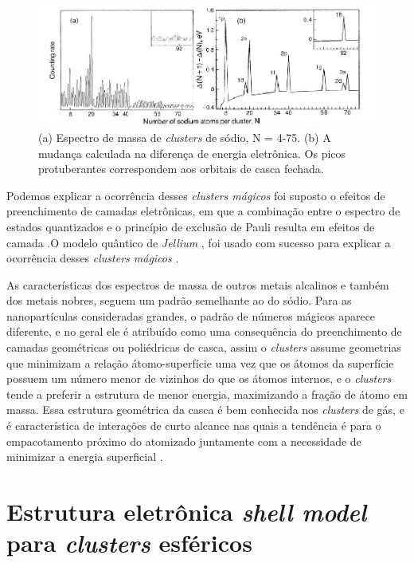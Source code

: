 \begin{figure}
  \centering
  \includegraphics[width=1\textwidth]{images/clusters/NA_knight}
  \caption{(a) Espectro de massa de \textit{clusters} de sódio, N = 4-75.
  (b) A mudança calculada na diferença de energia eletrônica. Os picos protuberantes correspondem aos orbitais de casca fechada.\cite{electronic_Shell_sodium}  }
  \label{fig:espec_na}
\end{figure}


Podemos explicar a ocorrência desses \textit{clusters mágicos} foi suposto o efeitos de preenchimento de camadas eletrônicas, em que a combinação entre o espectro de estados
quantizados e o princípio de exclusão de Pauli resulta em efeitos de camada \cite{Brack}.O modelo quântico de \textit{Jellium} \cite{Heer}, foi usado com sucesso para explicar a ocorrência desses \textit{clusters mágicos} \cite{capitulo_livro_shell}.

As características dos espectros de massa de outros metais alcalinos e também dos metais nobres, seguem um padrão semelhante ao do sódio. Para as nanopartículas consideradas grandes, o padrão de números mágicos aparece diferente, e no geral ele é atribuído como uma consequência do preenchimento de camadas geométricas ou poliédricas de casca, assim o \textit{clusters} assume geometrias que minimizam a relação átomo-superfície uma vez que os átomos da superfície possuem um número menor de vizinhos do que os átomos internos, e o \textit{clusters} tende a preferir a estrutura de menor energia, maximizando a fração de átomo em massa. Essa estrutura geométrica da casca é bem conhecida nos \textit{clusters} de gás, e é característica de interações de curto alcance nas quais a tendência é para o empacotamento próximo do atomizado juntamente com a necessidade de minimizar a energia superficial \cite{capitulo_livro_shell}.




\section{Estrutura eletrônica \textit{shell model} para \textit{clusters} esféricos} \label{section_shell_model}

